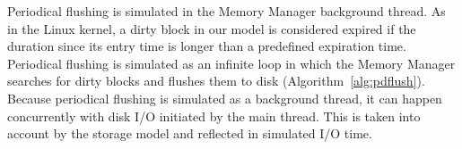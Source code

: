 Periodical flushing is simulated in the Memory Manager
background thread. As in the Linux kernel, a dirty block
in our model is considered expired if
the duration since its entry time is longer than a
predefined expiration time.
Periodical flushing is simulated as an infinite loop in which
the Memory Manager searches for dirty blocks and flushes them to disk (Algorithm~\ref{alg:pdflush}).
Because periodical flushing is simulated as a background thread, it can happen concurrently
with disk I/O initiated by the main thread. This is taken into account by the
storage model and reflected in simulated I/O time.